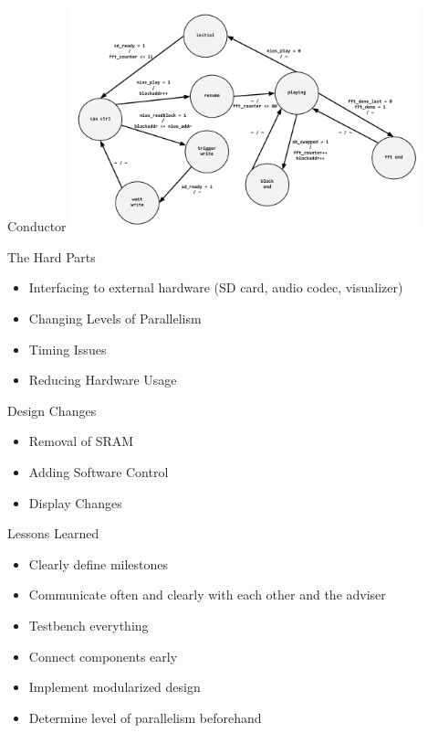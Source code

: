 \documentclass{beamer}
\begin{document}
\begin{frame}{Conductor}
	\centering
    \includegraphics[width=4in]{conductor_state}
\end{frame}

\begin{frame}{The Hard Parts}
	\begin{itemize}
		\item Interfacing to external hardware (SD card, audio codec, visualizer) 
		\item Changing Levels of Parallelism 
		\item Timing Issues
		\item Reducing Hardware Usage
	\end{itemize}
\end{frame}

\begin{frame}{Design Changes}
	\begin{itemize}
		\item Removal of SRAM
		\item Adding Software Control
		\item Display Changes
	\end{itemize}
\end{frame}

\begin{frame}{Lessons Learned}
	\begin{itemize}
		\item Clearly define milestones
		\item Communicate often and clearly with each other and the adviser
		\item Testbench everything
		\item Connect components early
		\item Implement modularized design
		\item Determine level of parallelism beforehand
	\end{itemize}
\end{frame}
\end{document}

